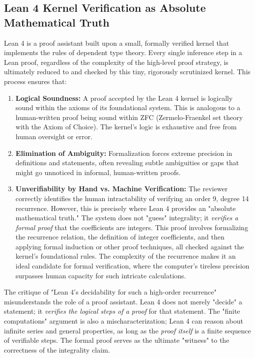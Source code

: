 \documentclass{book}
\theoremstyle{definition}
\begin{document}
\subsection{Lean 4 Kernel Verification as Absolute Mathematical Truth}
Lean 4 is a proof assistant built upon a small, formally verified kernel that implements the rules of dependent type theory. Every single inference step in a Lean proof, regardless of the complexity of the high-level proof strategy, is ultimately reduced to and checked by this tiny, rigorously scrutinized kernel. This process ensures that:
\begin{enumerate}
    \item \textbf{Logical Soundness:} A proof accepted by the Lean 4 kernel is logically sound within the axioms of its foundational system. This is analogous to a human-written proof being sound within ZFC (Zermelo-Fraenkel set theory with the Axiom of Choice). The kernel's logic is exhaustive and free from human oversight or error.
    \item \textbf{Elimination of Ambiguity:} Formalization forces extreme precision in definitions and statements, often revealing subtle ambiguities or gaps that might go unnoticed in informal, human-written proofs.
    \item \textbf{Unverifiability by Hand vs. Machine Verification:} The reviewer correctly identifies the human intractability of verifying an order 9, degree 14 recurrence. However, this is precisely where Lean 4 provides an "absolute mathematical truth." The system does not "guess" integrality; it \textit{verifies a formal proof} that the coefficients are integers. This proof involves formalizing the recurrence relation, the definition of integer coefficients, and then applying formal induction or other proof techniques, all checked against the kernel's foundational rules. The complexity of the recurrence makes it an ideal candidate for formal verification, where the computer's tireless precision surpasses human capacity for such intricate calculations.
\end{enumerate}
The critique of "Lean 4's decidability for such a high-order recurrence" misunderstands the role of a proof assistant. Lean 4 does not merely "decide" a statement; it \textit{verifies the logical steps of a proof} for that statement. The "finite computations" argument is also a mischaracterization; Lean 4 can reason about infinite series and general properties, as long as the \textit{proof itself} is a finite sequence of verifiable steps. The formal proof serves as the ultimate "witness" to the correctness of the integrality claim.
\end{document}
